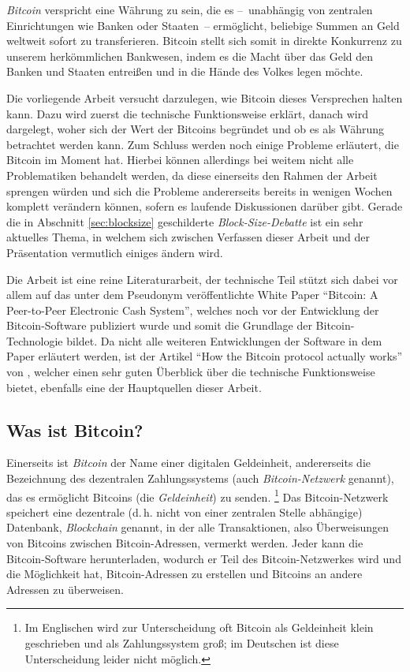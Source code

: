 \emph{Bitcoin} verspricht eine Währung zu sein, die es --~unabhängig von zentralen Einrichtungen wie Banken oder Staaten~-- ermöglicht, beliebige Summen an Geld weltweit sofort zu transferieren.
Bitcoin stellt sich somit in direkte Konkurrenz zu unserem herkömmlichen Bankwesen, indem es die Macht über das Geld den Banken und Staaten entreißen und in die Hände des Volkes legen möchte.

Die vorliegende Arbeit versucht darzulegen, wie Bitcoin dieses Versprechen halten kann.
Dazu wird zuerst die technische Funktionsweise erklärt, danach wird dargelegt, woher sich der Wert der Bitcoins begründet und ob es als Währung betrachtet werden kann.
Zum Schluss werden noch einige Probleme erläutert, die Bitcoin im Moment hat.
Hierbei können allerdings bei weitem nicht alle Problematiken behandelt werden, da diese einerseits den Rahmen der Arbeit sprengen würden und sich die Probleme andererseits bereits in wenigen Wochen komplett verändern können, sofern es laufende Diskussionen darüber gibt.
Gerade die in Abschnitt \ref{sec:blocksize} geschilderte \emph{Block-Size-Debatte} ist ein sehr aktuelles Thema, in welchem sich zwischen Verfassen dieser Arbeit und der Präsentation vermutlich einiges ändern wird.

Die Arbeit ist eine reine Literaturarbeit, der technische Teil stützt sich dabei vor allem auf das unter dem Pseudonym  veröffentlichte White Paper "`Bitcoin: A Peer-to-Peer Electronic Cash System"', welches noch vor der Entwicklung der Bitcoin-Software publiziert wurde und somit die Grundlage der Bitcoin-Technologie bildet. \parencite{nakamoto}
Da nicht alle weiteren Entwicklungen der Software in dem Paper erläutert werden, ist der Artikel "`How the Bitcoin protocol actually works"' von , welcher einen sehr guten Überblick über die technische Funktionsweise bietet, ebenfalls eine der Hauptquellen dieser Arbeit. \parencite{nielsen}

\subsection{Was ist Bitcoin?}
\label{sec:bitcoinintro}

Einerseits ist \emph{Bitcoin} der Name einer digitalen Geldeinheit, andererseits die Bezeichnung des dezentralen Zahlungssystems (auch \emph{Bitcoin-Netzwerk} genannt), das es ermöglicht Bitcoins (die \emph{Geldeinheit}) zu senden.%
\footnote{Im Englischen wird zur Unterscheidung oft Bitcoin als Geldeinheit klein geschrieben und als Zahlungssystem groß; im Deutschen ist diese Unterscheidung leider nicht möglich.}
Das Bitcoin-Netzwerk speichert eine dezentrale (d.\,h. nicht von einer zentralen Stelle abhängige) Datenbank, \emph{Blockchain} genannt, in der alle Transaktionen, also Überweisungen von Bitcoins zwischen Bitcoin-Adressen, vermerkt werden.
Jeder kann die Bitcoin-Software herunterladen, wodurch er Teil des Bitcoin-Netzwerkes wird und die Möglichkeit hat, Bitcoin-Adressen zu erstellen und Bitcoins an andere Adressen zu überweisen.
